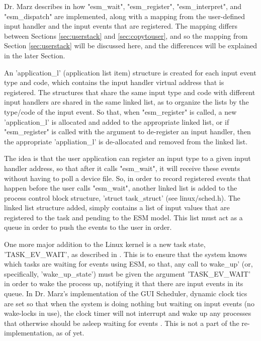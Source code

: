 \documentclass[10pt,journal,compsoc]{IEEEtran}
\begin{document}
Dr. Marz describes in \cite{Marz_BVZ_ESM} how "esm\_wait", "esm\_register", "esm\_interpret", and "esm\_dispatch" are implemented, along with a mapping from the user-defined input handler and the input events that are registered. The mapping differs between Sections \ref{sec:userstack} and \ref{sec:copytouser}, and so the mapping from Section \ref{sec:userstack} will be discussed here, and the differences will be explained in the later Section.

An 'application\_l' (application list item) structure is created for each input event type and code, which contains the input handler virtual address that is registered. The structures that share the same input type and code with different input handlers are shared in the same linked list, as to organize the lists by the type/code of the input event. So that, when "esm\_register" is called, a new 'application\_l' is allocated and added to the appropriate linked list, or if "esm\_register" is called with the argument to de-register an input handler, then the appropriate 'appliation\_l' is de-allocated and removed from the linked list.

The idea is that the user application can register an input type to a given input handler address, so that after it calls "esm\_wait", it will receive these events without having to poll a device file. So, in order to record registered events that happen before the user calls "esm\_wait", another linked list is added to the process control block structure, 'struct task\_struct' (see linux/sched.h). The linked list structure added, simply contains a list of input values that are registered to the task and pending to the ESM model. This list must act as a queue in order to push the events to the user in order.

One more major addition to the Linux kernel is a new task state, 'TASK\_EV\_WAIT', as described in \cite{Marz_BVZ_ESM}. This is to ensure that the system knows which tasks are waiting for events using ESM, so that, any call to wake\_up' (or, specifically, 'wake\_up\_state') must be given the argument 'TASK\_EV\_WAIT' in order to wake the process up, notifying it that there are input events in its queue. In Dr. Marz's implementation of the GUI Scheduler, dynamic clock tics are set so that when the system is doing nothing but waiting on input events (no wake-locks in use), the clock timer will not interrupt and wake up any processes that otherwise should be asleep waiting for events \cite{Marz2018ReducingPC}. This is not a part of the re-implementation, as of yet.
\end{document}

